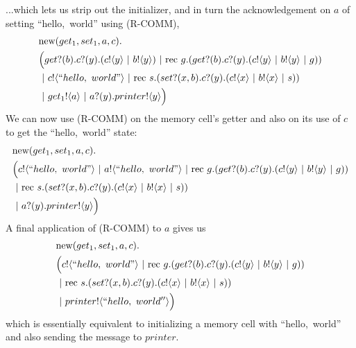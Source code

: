 	...which lets us strip out the initializer, and in turn the acknowledgement on $a$ of setting ``hello,\ world'' using (R-COMM),
	\begin{equation}\begin{split}
		&\text{new}({get_1,set_1,a,c}).\\
		&\Big({get}?({b}).{c}?({y}).({c}!\langle{y}\rangle\ |\  {b}!\langle{y}\rangle)\ |\  \text{rec }{g}.({get}?({b}).{c}?({y}).({c}!\langle{y}\rangle\ |\  {b}!\langle{y}\rangle\ |\  g))\\
			&\ |\  {c}!\langle{``hello,\ world"}\rangle \ |\  \text{rec }{s}.({set}?({x,b}).{c}?({y}).({c}!\langle{x}\rangle\ |\ {b}!\langle{x}\rangle\ |\  s))\\
		&\ |\  {get_1}!\langle{a}\rangle\ |\  {a}?({y}).{printer}!\langle{y}\rangle\Big)
	\end{split}\end{equation}
	We can now use (R-COMM) on the memory cell's getter and also on its use of $c$ to get the ``hello,\ world'' state:
	\begin{equation}\begin{split}
		&\new{get_1,set_1,a,c}\\
		&\Big(\send{c}{``hello,\ world"}\comp \send{a}{``hello,\ world"}\comp \rec{g}(\receive{get}{b}\receive{c}{y}(\send{c}{y}\comp \send{b}{y}\comp g))\\
			&\comp \rec{s}(\receive{set}{x,b}\receive{c}{y}(\send{c}{x}\comp\send{b}{x}\comp s))\\
		&\comp \receive{a}{y}\send{printer}{y}\Big)
	\end{split}\end{equation}
	A final application of (R-COMM) to $a$ gives us
	\begin{equation}\begin{split}
		&\text{new}({get_1,set_1,a,c}).\\
		&\Big({c}!\langle{``hello,\ world"}\rangle\ |\  \text{rec }{g}.({get}?({b}).{c}?({y}).({c}!\langle{y}\rangle\ |\  {b}!\langle{y}\rangle\ |\  g))\\
			&\ |\  \text{rec }{s}.({set}?({x,b}).{c}?({y}).({c}!\langle{x}\rangle\ |\ {b}!\langle{x}\rangle\ |\  s))\\
		&\ |\  {printer}!\langle{``hello,\ world''}\rangle\Big)
	\end{split}\end{equation}
	which is essentially equivalent to initializing a memory cell with ``hello,\ world'' and also sending the message to $printer$.